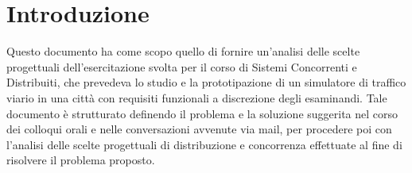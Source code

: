 \section{Introduzione}
Questo documento ha come scopo quello di fornire un'analisi delle scelte progettuali dell'esercitazione svolta per il corso di Sistemi Concorrenti e Distribuiti, che prevedeva lo studio e la prototipazione di un simulatore di traffico viario in una città con requisiti funzionali a discrezione degli esaminandi. Tale documento è strutturato definendo il problema e la soluzione suggerita nel corso dei colloqui orali e nelle conversazioni avvenute via mail, per procedere poi con l'analisi delle scelte progettuali di distribuzione e concorrenza effettuate al fine di risolvere il problema proposto.